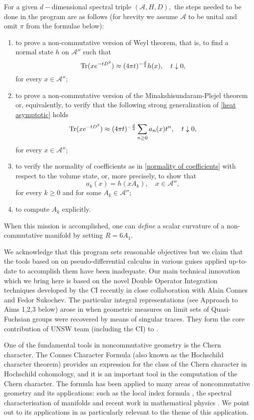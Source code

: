 \documentclass[12pt]{article}
\begin{document}
For a given $d-$dimensional spectral triple $(\mathcal{A},H,D),$ the steps needed to be done in the program are as follows (for brevity we assume $\mathcal{A}$ to be unital and omit $\pi$ from the formulae below):
\begin{enumerate}
\item\label{raph1} to prove a non-commutative version of Weyl theorem, that is, to find a normal state $h$ on $\mathcal{A}''$ such that  
\begin{equation}\label{raph1 eq}
{\rm Tr}(xe^{-tD^2})\approx (4\pi t)^{-\frac{d}{2}} h(x),\quad t\downarrow0,
\end{equation}
for every $x\in\mathcal{A}'';$
\item\label{raph2} to prove a non-commutative version of the Minakshisundaram-Plejel theorem or, equivalently, to verify that the following strong generalization of \eqref{heat asymptotic} holds
$${\rm Tr}(xe^{-tD^2})\approx (4\pi t)^{-\frac{d}{2}} \sum_{n\geq0}a_n(x)t^n,\quad t\downarrow0,$$
for every $x\in \mathcal{A}'';$ 
\item\label{raph3} to verify the normality of coefficients as in \eqref{normality of coefficients} with respect to the volume state, or, more precisely, to show that
$$a_k(x)=h(xA_k),\quad x\in\mathcal{A}'',$$
for every $k\geq0$ and for some $A_k\in\mathcal{A}'';$ 
\item\label{raph4} to compute $A_k$ explicitly.
\end{enumerate}
When this mission is accomplished, one can {\it define} a scalar curvature of a non-commutative manifold by setting $R=6A_1.$

We acknowledge that this program sets reasonable objectives but we claim that the tools based on on pseudo-differential calculus in various guises applied up-to-date to accomplish them have been inadequate. Our main technical innovation which we bring here is based on the novel Double Operator Integration techniques developed by the CI recently in close collaboration with Alain Connes and Fedor Sukochev. The particular integral representations (see Approach to Aims 1,2,3 below) arose in \cite{Connes_team} when geometric measures on limit sets of Quasi-Fuchsian groups were recovered by means of singular traces. They form the core contribution of UNSW team (including the CI) to \cite{Connes_team}.


One of the fundamental tools in noncommutative geometry is the Chern character. The Connes Character Formula (also known as the Hochschild character theorem) provides an expression for the class of the Chern character in Hochschild cohomology, and it is an important tool in the computation of the Chern character. The formula has been applied to many areas     of noncommutative geometry and its applications: such as the local index formula \cite{ConnesMoscovici}, the spectral characterisation of manifolds \cite{Connes-reconstruction} and recent work in mathematical physics \cite{Connes-Chamseddine-Mukhanov-quanta-of-geometry-2015}. We point out to its applications in \cite{Connes-reconstruction} as particularly relevant to the theme of this application.
\end{document}

